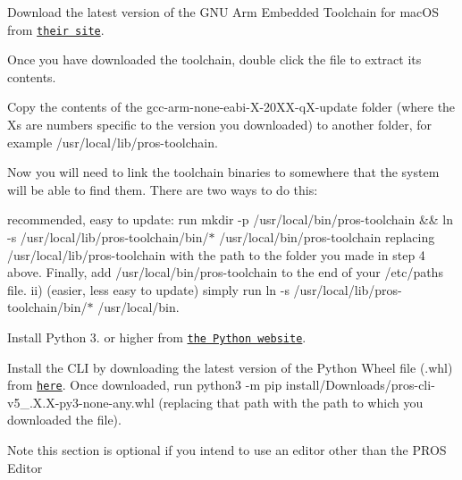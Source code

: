 \begin{DoxyEnumerate}
\item Download the latest version of the G\+NU Arm Embedded Toolchain for mac\+OS from \href{https://developer.arm.com/open-source/gnu-toolchain/gnu-rm/downloads}{\tt their site}.
\item Once you have downloaded the toolchain, double click the file to extract its contents.
\item Copy the contents of the {\ttfamily gcc-\/arm-\/none-\/eabi-\/\+X-\/20\+X\+X-\/q\+X-\/update} folder (where the Xs are numbers specific to the version you downloaded) to another folder, for example {\ttfamily /usr/local/lib/pros-\/toolchain}.
\item Now you will need to link the toolchain binaries to somewhere that the system will be able to find them. There are two ways to do this\+:
\begin{DoxyItemize}
\item recommended, easy to update\+: run {\ttfamily mkdir -\/p /usr/local/bin/pros-\/toolchain \&\& ln -\/s /usr/local/lib/pros-\/toolchain/bin/$\ast$ /usr/local/bin/pros-\/toolchain} replacing {\ttfamily /usr/local/lib/pros-\/toolchain} with the path to the folder you made in step 4 above. Finally, add {\ttfamily /usr/local/bin/pros-\/toolchain} to the end of your {\ttfamily /etc/paths} file. ii) (easier, less easy to update) simply run {\ttfamily ln -\/s /usr/local/lib/pros-\/toolchain/bin/$\ast$ /usr/local/bin}.
\end{DoxyItemize}
\end{DoxyEnumerate}


\begin{DoxyEnumerate}
\item Install Python 3. or higher from \href{http://python.org}{\tt the Python website}.
\item Install the C\+LI by downloading the latest version of the Python Wheel file (.whl) from \href{https://github.com/purduesigbots/pros-cli3/releases/latest}{\tt here}. Once downloaded, run python3 -\/m pip install/\+Downloads/pros-\/cli-\/v5\+\_.\+X.\+X-\/py3-\/none-\/any.\+whl (replacing that path with the path to which you downloaded the file).
\end{DoxyEnumerate}

\begin{DoxyNote}{Note}
this section is optional if you intend to use an editor other than the P\+R\+OS Editor
\end{DoxyNote}

